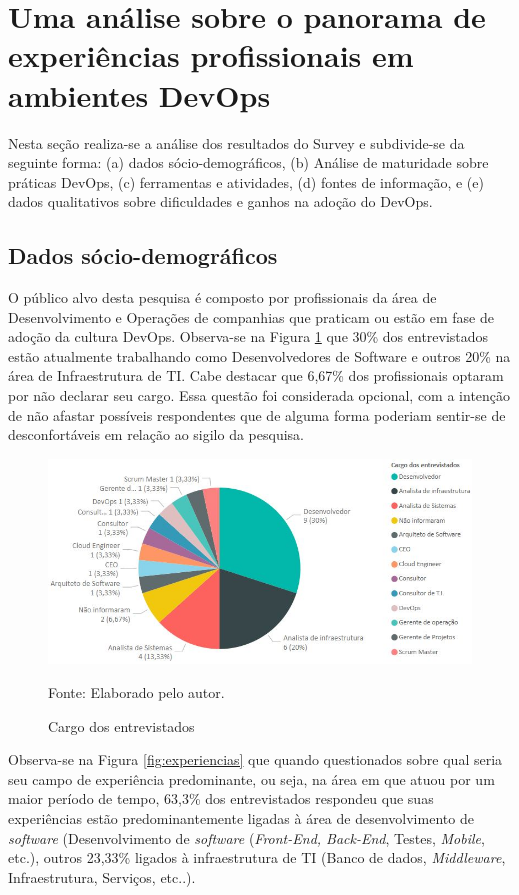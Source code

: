 \documentclass[twoside,english,brazilian]{UNISINOSartigo}
\newcommand{\source}[1]{\caption*{Fonte: {#1}} }
\begin{document}
\section{Uma análise sobre o panorama de experiências profissionais em ambientes DevOps}
Nesta seção realiza-se a análise dos resultados do Survey e subdivide-se da seguinte forma: (a) dados sócio-demográficos, (b) Análise de maturidade sobre práticas DevOps, (c) ferramentas e atividades, (d) fontes de informação, e (e) dados qualitativos sobre dificuldades e ganhos na adoção do DevOps.

\subsection{Dados sócio-demográficos}
O público alvo desta pesquisa é composto por profissionais da área de Desenvolvimento e Operações de companhias que praticam ou estão em fase de adoção da cultura DevOps. Observa-se na Figura \ref{fig:cargos} que 30\% dos entrevistados estão atualmente trabalhando como Desenvolvedores de Software e outros 20\% na área de Infraestrutura de TI.  Cabe destacar que 6,67\% dos profissionais optaram por não declarar seu cargo. Essa questão foi considerada opcional, com a intenção de não afastar possíveis respondentes que de alguma forma poderiam sentir-se de desconfortáveis em relação ao sigilo da pesquisa. 
\begin{figure}[H]
    \centering
    \caption{Cargo dos entrevistados}
       \includegraphics[scale=.6]{imagens/cargos_pbi.JPG}
       \source{Elaborado pelo autor.}
    \label{fig:cargos}
\end{figure}
Observa-se na Figura \ref{fig:experiencias} que quando questionados sobre qual seria seu campo de experiência predominante, ou seja, na área em que atuou por um maior período de tempo, 63,3\% dos entrevistados respondeu que suas experiências estão predominantemente ligadas à área de desenvolvimento de \textit{software} (Desenvolvimento de \textit{software} (\textit{Front-End, Back-End}, Testes, \textit{Mobile}, etc.), outros 23,33\% ligados à infraestrutura de TI (Banco de dados, \textit{Middleware}, Infraestrutura, Serviços, etc..).
\end{document}
